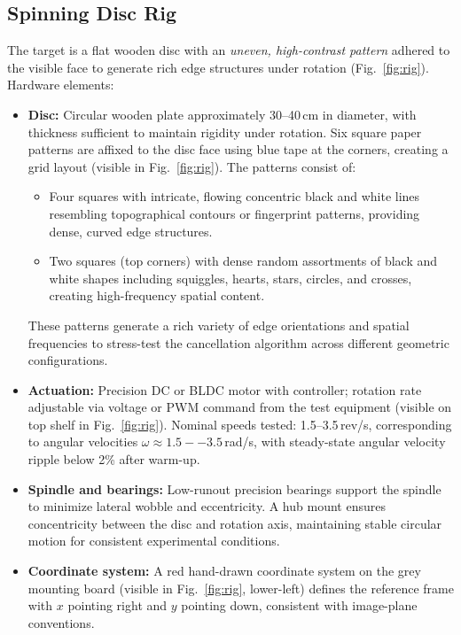 \subsection{Spinning Disc Rig}
The target is a flat wooden disc with an \emph{uneven, high-contrast pattern} adhered to the visible face to generate rich edge structures under rotation (Fig.~\ref{fig:rig}). Hardware elements:

\begin{itemize}
  \item \textbf{Disc:} Circular wooden plate approximately 30--40\,cm in diameter, with thickness sufficient to maintain rigidity under rotation. Six square paper patterns are affixed to the disc face using blue tape at the corners, creating a grid layout (visible in Fig.~\ref{fig:rig}). The patterns consist of:
  \begin{itemize}
    \item Four squares with intricate, flowing concentric black and white lines resembling topographical contours or fingerprint patterns, providing dense, curved edge structures.
    \item Two squares (top corners) with dense random assortments of black and white shapes including squiggles, hearts, stars, circles, and crosses, creating high-frequency spatial content.
  \end{itemize}
  These patterns generate a rich variety of edge orientations and spatial frequencies to stress-test the cancellation algorithm across different geometric configurations.
  \item \textbf{Actuation:} Precision DC or BLDC motor with controller; rotation rate adjustable via voltage or PWM command from the test equipment (visible on top shelf in Fig.~\ref{fig:rig}). Nominal speeds tested: 1.5--3.5\,rev/s, corresponding to angular velocities $\omega \approx 1.5--3.5$\,rad/s, with steady-state angular velocity ripple below 2\% after warm-up.
  \item \textbf{Spindle and bearings:} Low-runout precision bearings support the spindle to minimize lateral wobble and eccentricity. A hub mount ensures concentricity between the disc and rotation axis, maintaining stable circular motion for consistent experimental conditions.
  \item \textbf{Coordinate system:} A red hand-drawn coordinate system on the grey mounting board (visible in Fig.~\ref{fig:rig}, lower-left) defines the reference frame with $x$ pointing right and $y$ pointing down, consistent with image-plane conventions.
\end{itemize}

